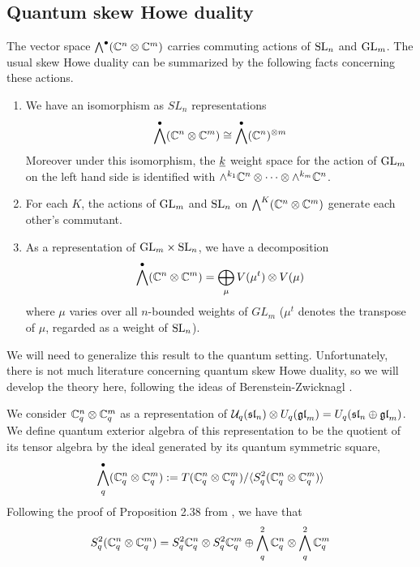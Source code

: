 \documentclass[10pt,leqno]{article}
\begin{document}
\subsection{Quantum skew Howe duality}
The vector space $\bigwedge^\bullet(\mathbb C^n \otimes \mathbb C^m)$ carries commuting actions of ${\rm{SL}}_n $ and ${\rm{GL}}_m$.  The usual skew Howe duality can be summarized by the following facts concerning these actions.
\begin{thm}
\begin{enumerate}
\item We have an isomorphism as $ SL_n $ representations 
\begin{equation}
 \bigwedge^\bullet(\mathbb C^n \otimes \mathbb C^m) \cong \bigwedge^\bullet({\mathbb{C}}^n)^{\otimes m}
 \end{equation}
Moreover under this isomorphism, the $ {\underline{k}} $ weight space for the action of $ {\rm{GL}}_m $ on the left hand side is identified with $\wedge^{k_1} \mathbb C^n \otimes \cdots \otimes \wedge^{k_m} \mathbb C^n$.
\item For each $ K $, the actions of $ {\rm{GL}}_m $ and $ {\rm{SL}}_n $ on $ \bigwedge^K({\mathbb{C}}^n \otimes {\mathbb{C}}^m) $ generate each other's commutant.
\item As a representation of $ {\rm{GL}}_m \times {\rm{SL}}_n  $, we have a decomposition
$$ \bigwedge^\bullet (\mathbb C^n \otimes \mathbb C^m) = \bigoplus_{\mu} V(\mu^t) \otimes V(\mu) $$
where $\mu$ varies over all $n$-bounded weights of $ GL_m$ ($\mu^t$ denotes the transpose of $\mu$, regarded as a weight of ${\rm{SL}}_n$).
\end{enumerate}
\end{thm}

We will need to generalize this result to the quantum setting.  Unfortunately, there is not much literature concerning quantum skew Howe duality, so we will develop the theory here, following the ideas of Berenstein-Zwicknagl \cite{BW}.  

We consider $ {\mathbb{C}}^n_q \otimes {\mathbb{C}}^m_q $ as a representation of $\mathcal{U}_q({\mathfrak{sl}}_n) \otimes U_q({\mathfrak{gl}}_m) = U_q({\mathfrak{sl}}_n \oplus {\mathfrak{gl}}_m) $.
We define quantum exterior algebra of this representation to be the quotient of its tensor algebra by the ideal generated by its quantum symmetric square,
$$\bigwedge^\bullet_q({\mathbb{C}}_q^n \otimes {\mathbb{C}}_q^m) := T ({\mathbb{C}}_q^n \otimes {\mathbb{C}}_q^m) / \langle S^2_q ({\mathbb{C}}_q^n \otimes {\mathbb{C}}_q^m) \rangle$$
Following the proof of Proposition 2.38 from \cite{BW}, we have that 
$$ S^2_q ({\mathbb{C}}_q^n \otimes {\mathbb{C}}_q^m) = S^2_q {\mathbb{C}}_q^n \otimes S^2_q {\mathbb{C}}_q^m \oplus \bigwedge^2_q {\mathbb{C}}_q^n \otimes \bigwedge^2_q {\mathbb{C}}_q^m $$
\end{document}
